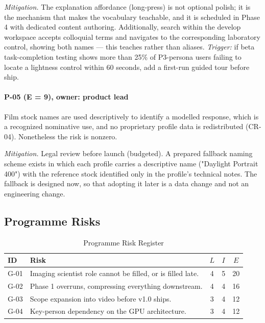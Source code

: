 \emph{Mitigation.} The explanation affordance (long-press) is not optional
polish; it is the mechanism that makes the vocabulary teachable, and it is
scheduled in Phase 4 with dedicated content authoring. Additionally, search
within the develop workspace accepts colloquial terms and navigates to the
corresponding laboratory control, showing both names --- this teaches rather
than aliases. \emph{Trigger:} if beta task-completion testing shows more than
25\% of P3-persona users failing to locate a lightness control within 60
seconds, add a first-run guided tour before ship.

\paragraph{P-05 (E = 9), owner: product lead}
Film stock names are used descriptively to identify a modelled response, which
is a recognized nominative use, and no proprietary profile data is
redistributed (CR-04). Nonetheless the risk is nonzero.

\emph{Mitigation.} Legal review before launch (budgeted). A prepared fallback
naming scheme exists in which each profile carries a descriptive name
("Daylight Portrait 400") with the reference stock identified only in the
profile's technical notes. The fallback is designed now, so that adopting it
later is a data change and not an engineering change.

\subsection{Programme Risks}

\begin{table}[htbp]
\caption{Programme Risk Register}
\label{tab:progrisk}
\begin{center}
\renewcommand{\arraystretch}{1.15}
\begin{tabularx}{\columnwidth}{@{}l>{\raggedright\arraybackslash}Xccc@{}}
\toprule
\textbf{ID} & \textbf{Risk} & $L$ & $I$ & $E$ \\
\midrule
G-01 & Imaging scientist role cannot be filled, or is filled late. & 4 & 5 & 20 \\
G-02 & Phase 1 overruns, compressing everything downstream. & 4 & 4 & 16 \\
G-03 & Scope expansion into video before v1.0 ships. & 3 & 4 & 12 \\
G-04 & Key-person dependency on the GPU architecture. & 3 & 4 & 12 \\
\bottomrule
\end{tabularx}
\end{center}
\end{table}

